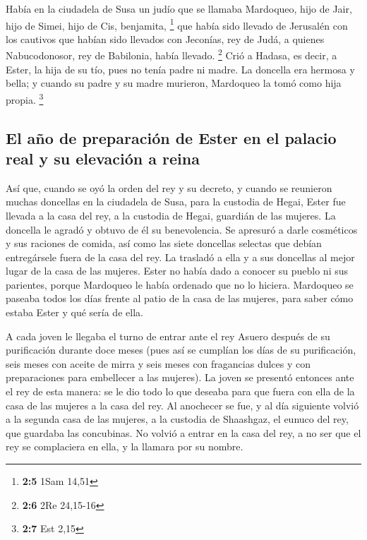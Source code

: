  Había en la ciudadela de Susa un judío que se llamaba
Mardoqueo, hijo de Jair, hijo de Simei, hijo de Cis, benjamita,
\footnote{\textbf{2:5} 1Sam 14,51}  que había sido llevado
de Jerusalén con los cautivos que habían sido llevados con Jeconías, rey
de Judá, a quienes Nabucodonosor, rey de Babilonia, había llevado.
\footnote{\textbf{2:6} 2Re 24,15-16}  Crió a Hadasa, es
decir, a Ester, la hija de su tío, pues no tenía padre ni madre. La
doncella era hermosa y bella; y cuando su padre y su madre murieron,
Mardoqueo la tomó como hija propia. \footnote{\textbf{2:7} Est 2,15}

\hypertarget{el-auxf1o-de-preparaciuxf3n-de-ester-en-el-palacio-real-y-su-elevaciuxf3n-a-reina}{%
\subsection{El año de preparación de Ester en el palacio real y su
elevación a
reina}\label{el-auxf1o-de-preparaciuxf3n-de-ester-en-el-palacio-real-y-su-elevaciuxf3n-a-reina}}

 Así que, cuando se oyó la orden del rey y su decreto, y
cuando se reunieron muchas doncellas en la ciudadela de Susa, para la
custodia de Hegai, Ester fue llevada a la casa del rey, a la custodia de
Hegai, guardián de las mujeres.  La doncella le agradó y
obtuvo de él su benevolencia. Se apresuró a darle cosméticos y sus
raciones de comida, así como las siete doncellas selectas que debían
entregársele fuera de la casa del rey. La trasladó a ella y a sus
doncellas al mejor lugar de la casa de las mujeres. 
Ester no había dado a conocer su pueblo ni sus parientes, porque
Mardoqueo le había ordenado que no lo hiciera.  Mardoqueo
se paseaba todos los días frente al patio de la casa de las mujeres,
para saber cómo estaba Ester y qué sería de ella.

 A cada joven le llegaba el turno de entrar ante el rey
Asuero después de su purificación durante doce meses (pues así se
cumplían los días de su purificación, seis meses con aceite de mirra y
seis meses con fragancias dulces y con preparaciones para embellecer a
las mujeres).  La joven se presentó entonces ante el rey
de esta manera: se le dio todo lo que deseaba para que fuera con ella de
la casa de las mujeres a la casa del rey.  Al anochecer
se fue, y al día siguiente volvió a la segunda casa de las mujeres, a la
custodia de Shaashgaz, el eunuco del rey, que guardaba las concubinas.
No volvió a entrar en la casa del rey, a no ser que el rey se
complaciera en ella, y la llamara por su nombre.

